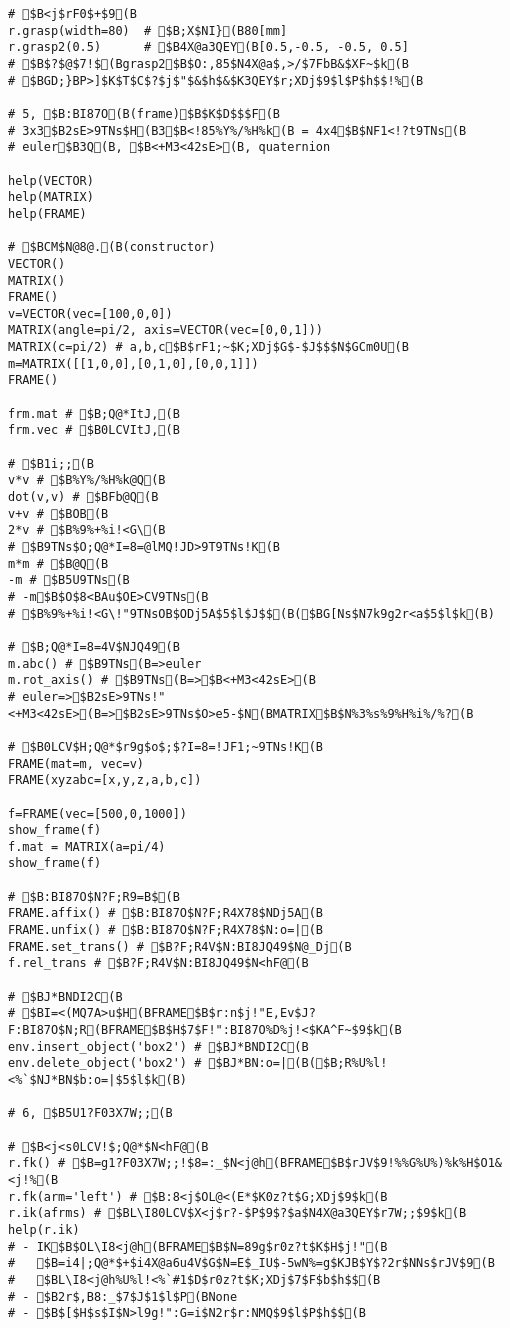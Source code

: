 \documentclass[11pt]{jarticle}
\begin{document}
{{{{\begin{verbatim}
# $B<j$rF0$+$9(B
r.grasp(width=80)  # $B;X$NI}(B80[mm]
r.grasp2(0.5)      # $B4X@a3QEY(B[0.5,-0.5, -0.5, 0.5]
# $B$?$@$7!$(Bgrasp2$B$O:,85$N4X@a$,>/$7FbB&$XF~$k(B
# $BGD;}BP>]$K$T$C$?$j$"$&$h$&$K3QEY$r;XDj$9$l$P$h$$!%(B

# 5, $B:BI87O(B(frame)$B$K$D$$$F(B
# 3x3$B2sE>9TNs$H(B3$B<!85%Y%/%H%k(B = 4x4$B$NF1<!?t9TNs(B
# euler$B3Q(B, $B<+M3<42sE>(B, quaternion

help(VECTOR)
help(MATRIX)
help(FRAME)

# $BCM$N@8@.(B(constructor)
VECTOR()
MATRIX()
FRAME()
v=VECTOR(vec=[100,0,0])
MATRIX(angle=pi/2, axis=VECTOR(vec=[0,0,1]))
MATRIX(c=pi/2) # a,b,c$B$rF1;~$K;XDj$G$-$J$$$N$GCm0U(B
m=MATRIX([[1,0,0],[0,1,0],[0,0,1]])
FRAME()

frm.mat # $B;Q@*ItJ,(B
frm.vec # $B0LCVItJ,(B

# $B1i;;(B
v*v # $B%Y%/%H%k@Q(B
dot(v,v) # $BFb@Q(B
v+v # $BOB(B
2*v # $B%9%+%i!<G\(B
# $B9TNs$O;Q@*I=8=@lMQ!JD>9T9TNs!K(B
m*m # $B@Q(B
-m # $B5U9TNs(B
# -m$B$O$8<BAu$OE>CV9TNs(B
# $B%9%+%i!<G\!"9TNsOB$ODj5A$5$l$J$$(B($BG[Ns$N7k9g2r<a$5$l$k(B)

# $B;Q@*I=8=4V$NJQ49(B
m.abc() # $B9TNs(B=>euler
m.rot_axis() # $B9TNs(B=>$B<+M3<42sE>(B
# euler=>$B2sE>9TNs!"<+M3<42sE>(B=>$B2sE>9TNs$O>e5-$N(BMATRIX$B$N%3%s%9%H%i%/%?(B

# $B0LCV$H;Q@*$r9g$o$;$?I=8=!JF1;~9TNs!K(B
FRAME(mat=m, vec=v)
FRAME(xyzabc=[x,y,z,a,b,c])

f=FRAME(vec=[500,0,1000])
show_frame(f)
f.mat = MATRIX(a=pi/4)
show_frame(f)

# $B:BI87O$N?F;R9=B$(B
FRAME.affix() # $B:BI87O$N?F;R4X78$NDj5A(B
FRAME.unfix() # $B:BI87O$N?F;R4X78$N:o=|(B
FRAME.set_trans() # $B?F;R4V$N:BI8JQ49$N@_Dj(B
f.rel_trans # $B?F;R4V$N:BI8JQ49$N<hF@(B

# $BJ*BNDI2C(B
# $BI=<(MQ7A>u$H(BFRAME$B$r:n$j!"E,Ev$J?F:BI87O$N;R(BFRAME$B$H$7$F!":BI87O%D%j!<$KA^F~$9$k(B
env.insert_object('box2') # $BJ*BNDI2C(B
env.delete_object('box2') # $BJ*BN:o=|(B($B;R%U%l!<%`$NJ*BN$b:o=|$5$l$k(B)

# 6, $B5U1?F03X7W;;(B

# $B<j<s0LCV!$;Q@*$N<hF@(B
r.fk() # $B=g1?F03X7W;;!$8=:_$N<j@h(BFRAME$B$rJV$9!%%G%U%)%k%H$O1&<j!%(B
r.fk(arm='left') # $B:8<j$OL@<(E*$K0z?t$G;XDj$9$k(B
r.ik(afrms) # $BL\I80LCV$X<j$r?-$P$9$?$a$N4X@a3QEY$r7W;;$9$k(B
help(r.ik)
# - IK$B$OL\I8<j@h(BFRAME$B$N=89g$r0z?t$K$H$j!"(B
#   $B=i4|;Q@*$+$i4X@a6u4V$G$N=E$_IU$-5wN%=g$KJB$Y$?2r$NNs$rJV$9(B
#   $BL\I8<j@h%U%l!<%`#1$D$r0z?t$K;XDj$7$F$b$h$$(B
# - $B2r$,B8:_$7$J$1$l$P(BNone
# - $B$[$H$s$I$N>l9g!":G=i$N2r$r:NMQ$9$l$P$h$$(B


\end{verbatim}}}}}
\end{document}
